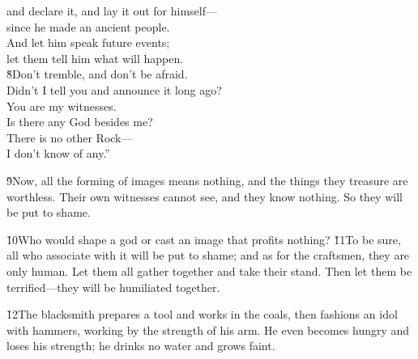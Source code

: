 \begin{poetry}
\poemll    and declare it, and lay it out for himself--- \\
\poeml since he made an ancient people. \\
\poemll    And let him speak future events; \\
\poemlll       let them tell him what will happen. \\
\poeml \v{8}Don't tremble, and don't be afraid. \\
\poemll    Didn't I tell you and announce it long ago? \\
\poeml You are my witnesses. \\
\poemll    Is there any God besides me? \\
\poeml There is no other Rock--- \\
\poemll    I don't know of any.''
\end{poetry}

\v{9}Now, all the forming of images means nothing, and the things they treasure are worthless. Their own witnesses cannot see, and they know nothing. So they will be put to shame.

\v{10}Who would shape a god or cast an image that profits nothing? \v{11}To be sure, all who associate with it will be put to shame; and as for the craftsmen, they are only human. Let them all gather together and take their stand. Then let them be terrified---they will be humiliated together.

\v{12}The blacksmith prepares a tool and works in the coals, then fashions an idol with hammers, working by the strength of his arm. He even becomes hungry and loses his strength; he drinks no water and grows faint.

